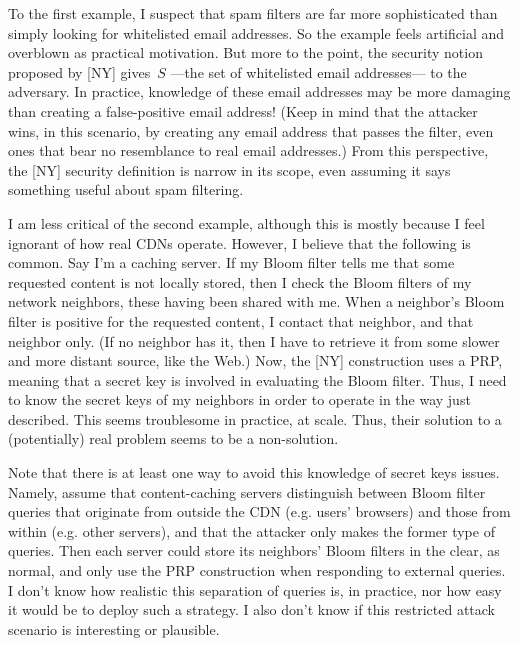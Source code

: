 To the first example, I suspect that spam filters are far more sophisticated than simply looking for whitelisted email addresses.  So the example feels artificial and overblown as practical motivation.  But more to the point, the security notion proposed by [NY] gives~$S$ ---the set of whitelisted email addresses--- to the adversary.  In practice, knowledge of these email addresses may be more damaging than creating a false-positive email address! (Keep in mind that the attacker wins, in this scenario, by creating any email address that passes the filter, even ones that bear no resemblance to real email addresses.)  From this perspective, the [NY] security definition is narrow in its scope, even assuming it says something useful about spam filtering.


I am less critical of the second example, although this is mostly because I feel ignorant of how real CDNs operate.  However, I believe that the following is common.  Say I'm a caching server.  If my Bloom filter tells me that some requested content is not locally stored, then I check the Bloom filters of my network neighbors, these having been shared with me.  When a neighbor's Bloom filter is positive for the requested content, I contact that neighbor, and that neighbor only.  (If no neighbor has it, then I have to retrieve it from some slower and more distant source, like the Web.)  Now, the [NY] construction uses a PRP, meaning that a secret key is involved in evaluating the Bloom filter.  Thus, I need to know the secret keys of my neighbors in order to operate in the way just described.  This seems troublesome in practice, at scale.  Thus, their solution to a (potentially) real problem seems to be a non-solution.

Note that there is at least one way to avoid this knowledge of secret keys issues.  Namely, assume that content-caching servers distinguish between Bloom filter queries that originate from outside the CDN (e.g. users’ browsers) and those from within (e.g. other servers), and that the attacker only makes the former type of queries.  Then each server could store its neighbors’ Bloom filters in the clear, as normal, and only use the PRP construction when responding to external queries.  I don’t know how realistic this separation of queries is, in practice, nor how easy it would be to deploy such a strategy.  I also don’t know if this restricted attack scenario is interesting or plausible.

